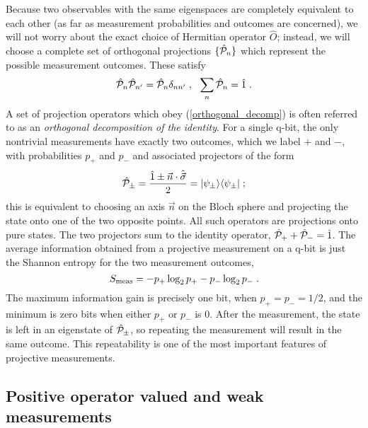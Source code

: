 \documentclass[12pt]{article}
\def\bra#1{{\langle #1 |}}
\def\ket#1{{| #1 \rangle}}
\def\svec{{\hat{\vec\sigma}}}
\def\nvec{{\vec n}}
\def\id{{\hat 1}}
\def\O{{\hat O}}
\def\P{{\hat{\cal P}}}
\begin{document}
Because two observables with the same eigenspaces are completely equivalent
to each other (as far as measurement probabilities and outcomes
are concerned), we will not worry about the exact choice
of Hermitian operator $\O$; instead, we will
choose a complete set of orthogonal projections $\{\P_n\}$ which
represent the possible measurement outcomes.  These satisfy
\begin{equation}
\P_n \P_{n'} = \P_n \delta_{nn'} \;, \ \ \sum_n \P_n = \id \;.
\label{orthogonal_decomp}
\end{equation}
A set of projection operators which obey (\ref{orthogonal_decomp}) is
often referred to as an {\it orthogonal decomposition of the identity}.  For
a single q-bit, the only nontrivial measurements have exactly two outcomes,
which we label $+$ and $-$, with probabilities $p_+$ and $p_-$ and
associated projectors of the form
\begin{equation}
\P_\pm = { \id \pm \nvec\cdot\svec \over 2 }
  = \ket{\psi_\pm}\bra{\psi_\pm} \;;
\end{equation}
this is equivalent to choosing an axis $\vec n$
on the Bloch sphere and projecting
the state onto one of the two opposite points.
All such operators are projections onto pure states.
The two projectors sum to the identity operator, $\P_++\P_-=\id$.
The average information obtained from a projective measurement on a q-bit is
just the Shannon entropy for the two measurement outcomes,
\begin{equation}
S_{\rm meas} = - p_+ \log_2 p_+ - p_- \log_2 p_- \;.
\label{shannon}
\end{equation}
The maximum information gain is precisely one bit, when $p_+=p_-=1/2$,
and the minimum is zero bits when either $p_+$ or $p_-$ is 0.
After the measurement, the state is left in an eigenstate of $\P_\pm$, so
repeating the measurement will result in the same outcome.  This repeatability
is one of the most important features of projective measurements.

\subsection{Positive operator valued and weak measurements}
\end{document}
